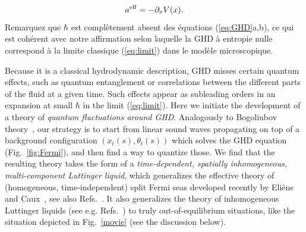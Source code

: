 \documentclass[twocolumn,amsfonts,showpacs,superscriptaddress]{revtex4-1}
\begin{document}
{\begin{equation*}
	a^{\rm eff}= -\partial_x V(x).
\end{equation*}
Remarquez que $\hbar$ est complètement absent des équations (\ref{eq:GHD}a,b), ce qui est cohérent avec notre affirmation selon laquelle la GHD à entropie nulle correspond à la limite classique (\ref{eq:limit}) dans le modèle microscopique.
}

\vspace{0.1cm} \; Because it is a classical hydrodynamic description, GHD misses certain quantum effects, such as quantum entanglement or correlations between the different parts of the fluid at a given time. Such effects appear as subleading orders in an expansion at small $\hbar$ in the limit (\ref{eq:limit}). Here we initiate the development of a theory of {\it quantum fluctuations around GHD}. Analogously to Bogoliubov theory~\cite{bogolyubov1947theory,pitaevskii2016bose,mora2003extension}, our strategy is to start from linear sound waves propagating on top of a background configuration $(x_t(s), \theta_t(s))$ which solves the GHD equation (Fig.~\ref{fig:Fermi}), and then find a way to quantize those. We find that the resulting theory takes the form of a {\it time-dependent, spatially inhomogeneous, multi-component Luttinger liquid}, which generalizes the effective theory of (homogeneous, time-independent) split Fermi seas developed recently by Eli\"ens and Caux~\cite{eliens2016general}, see also Refs.~\cite{fokkema2014split,vlijm2016correlations,eliens2017quantum}. It also generalizes the theory of inhomogeneous Luttinger liquids (see e.g. Refs.~\cite{gangardt2003stability,abanov2006hydrodynamics,dubail2017conformal,brun2017one,brun2018inhomogeneous,ruggiero2019conformal,cazalilla2004bosonizing}) to truly out-of-equilibrium situations, like the situation depicted in  Fig.~\ref{movie} (see the discussion below).
\end{document}
